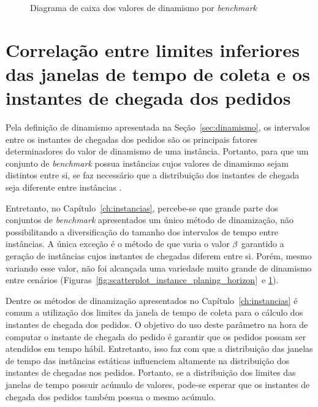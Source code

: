 \begin{figure}[H]
    \centering
    \caption{Diagrama de caixa dos valores de dinamismo por \textit{benchmark}}
    \label{fig:dynamism_boxplot_planing_horizon}
\end{figure}





\section{Correlação entre limites inferiores das janelas de tempo de coleta e
os instantes de chegada dos pedidos}

Pela definição de dinamismo apresentada na Seção~\ref{sec:dinamismo}, os 
intervalos entre os instantes de chegadas dos pedidos são os principais fatores
determinadores do valor de dinamismo de uma instância.
Portanto, para que um conjunto de \textit{benchmark} possua instâncias cujos 
valores de dinamismo sejam distintos entre si, se faz necessário que a 
distribuição dos instantes de chegada seja diferente entre instâncias 
\cite{van_lon_measures_2016}.

Entretanto, no Capítulo~\ref{ch:instancias}, percebe-se que grande parte dos 
conjuntos de \textit{benchmark} apresentados um único método de 
dinamização, não possibilitando a diversificação do tamanho dos intervalos de 
tempo entre instâncias.
A única exceção é o método de  que varia o 
valor $\beta$ garantido a geração de instâncias cujos instantes de 
chegadas diferem entre si.
Porém, mesmo variando esse valor, não foi alcançada uma variedade muito grande 
de dinamismo entre cenários 
(Figuras~\ref{fig:scatterplot_instance_planing_horizon}~e
\ref{fig:dynamism_boxplot_planing_horizon}).

Dentre os métodos de dinamização apresentados no Capítulo~\ref{ch:instancias} é 
comum a utilização dos limites da janela de tempo de coleta para o cálculo dos 
instantes de chegada dos pedidos.
O objetivo do uso deste parâmetro na hora de computar o instante de chegada do 
pedido é garantir que os pedidos possam ser atendidos em tempo hábil.
Entretanto, isso faz com que a distribuição das janelas de tempo das instâncias
estáticas influenciem altamente na distribuição dos instantes de chegadas nos 
pedidos.
Portanto, se a distribuição dos limites das janelas de tempo possuir acúmulo 
de valores, pode-se esperar que os instantes de chegada dos pedidos também  
possua o mesmo acúmulo.

